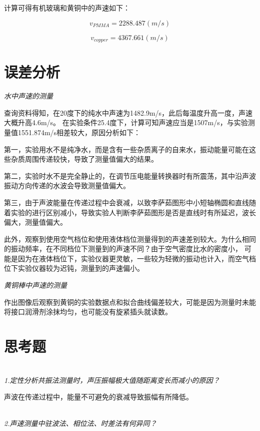 \documentclass[UTF8]{ctexart}
\begin{document}
    计算可得有机玻璃和黄铜中的声速如下：

    \begin{equation*}
        v_{PMMA}=2288.487(m/s)
    \end{equation*}

    \begin{equation*}
        v_{copper}=4367.661(m/s)
    \end{equation*}

    \section{误差分析}

    \emph{水中声速的测量}
    
    查询资料得知，在20度下的纯水中声速为1482.9m/s，此后每温度升高一度，声速大概升高4.6m/s。
    在实验条件25.4度下，计算可知声速应当是1507m/s，与实验测量值1551.874m/s相差较大，原因分析如下：

    第一，实验用水不是纯净水，而是含有一些杂质离子的自来水，振动能量可能在这些杂质周围传递较快，导致了测量值偏大的结果。

    第二，实验时水不是完全静止的，在调节压电能量转换器时有所震荡，其中沿声波振动方向传递的水波会导致测量值偏大。

    第三，由于声波能量在传递过程中会衰减，以致李萨茹图形中小短轴椭圆和直线随着实验的进行区别减小，导致实验人判断李萨茹图形是否是直线时有所延迟，波长偏大，测量值偏大。

    此外，观察到使用空气档位和使用液体档位测量得到的声速差别较大。为什么相同的振动频率，在不同档位下测量到的声速不同？由于空气密度比水的密度小，
    可能是因为在液体档位下，实验仪器更灵敏，一些较为轻微的振动也计入，而空气档位下实验仪器较为迟钝，测量到的声速偏小。

    \emph{黄铜棒中声速的测量}

    作出图像后观察到黄铜的实验数据点和拟合曲线偏差较大，可能是因为测量时未能将接口润滑剂涂抹均匀，也可能没有旋紧插头就读数。


    \section{思考题}
    
    \emph{\\[0.02cm]1.定性分析共振法测量时，声压振幅极大值随距离变长而减小的原因？}

    声波在传递过程中，能量不可避免的衰减导致振幅有所降低。

    \emph{\\[0.2cm]2.声速测量中驻波法、相位法、时差法有何异同？}
\end{document}
